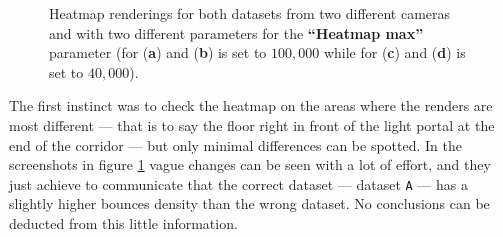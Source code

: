\begin{figure}
	\caption{Heatmap renderings for both datasets from two different cameras and with two different parameters for the \textbf{“Heatmap max”} parameter (for (\textbf{a}) and (\textbf{b}) is set to $100,000$ while for (\textbf{c}) and (\textbf{d}) is set to $40,000$).}
	\label{couple2heatmaps}
\end{figure}

The first instinct was to check the heatmap on the areas where the renders are most different --- that is to say the floor right in front of the light portal at the end of the corridor --- but only minimal differences can be spotted. In the screenshots in figure \ref{couple2heatmaps} vague changes can be seen with a lot of effort, and they just achieve to communicate that the correct dataset --- dataset \texttt{A} --- has a slightly higher bounces density than the wrong dataset. No conclusions can be deducted from this little information.

